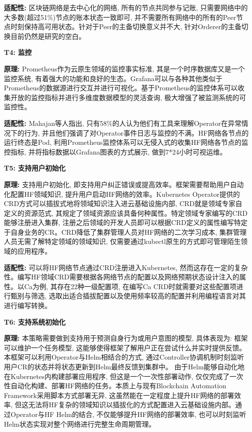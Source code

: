 \textbf{适配性: }区块链网络是去中心化的网络, 所有的节点共同参与记账, 只需要网络中的大多数(超过51\%)节点的账本状态一致即可, 并不需要所有网络中的所有的Peer节点时刻保持高可用状态。针对于Peer的主备切换意义并不大, 针对Orderer的主备切换目前仍然是研究的空白。

\textbf{T4: 监控}

\textbf{原理: }Prometheus\cite{sukhija2019towards}作为云原生领域的监控事实标准, 其是一个时序数据库又是一个监控系统, 有着强大的功能和良好的生态。Grafana可以与各种其他类似于Prometheus的数据源进行交互并进行可视化。基于Prometheus的监控体系可以收集开放的监控指标并进行多维度数据模型的灵活查询, 极大增强了被监测系统的可监控性。

\textbf{适配性: } Mahajan等人\cite{mahajan2020suture}指出, 只有58\%的人认为他们有工具来理解Operator在异常情况下的行为, 并且他们强调了对Operator事件日志与监控的不满。HF网络各节点的运行终态是Pod, 利用Prometheus监控体系可以无侵入式的收集HF网络各节点的监控指标, 并将指标数据以Grafana图表的方式展示, 做到7*24小时可视运维。


\textbf{T5: 支持用户初始化}

\textbf{原理: }支持用户初始化, 即支持用户纠正错误或提高效率。框架需要帮助用户自动化配置HF领域知识, 提升用户启动HF网络的效率。Kubernetes Operator提供的CRD方式可以插拔式地将领域知识注入进云基础设施内部, CRD就是领域专家自定义的资源范式, 其规定了领域资源应该具备何种属性。特定领域专家编写的CRD能够注册进入集群, 注册之后领域的开发人员即可以根据CRD定义的属性编写特定于自身业务的CR。CRD降低了集群管理人员对HF网络的二次学习成本, 集群管理人员无需了解特定领域的领域知识, 仅需要通过kubectl原生的方式即可管理陌生领域的应用程序。

\textbf{适配性: }可以将HF网络节点通过CRD注册进入Kubernetes, 然而这存在一定的复杂性。编写HF领域CRD需要根据各网络节点的配置\footnotemark[1]\footnotemark[2]\footnotemark[3]以及网络预期状态设计注入的属性。以Ca为例, 其存在22种一级配置项, 在编写Ca CRD时就需要对这些配置项进行甄别与筛选, 选取出适合插拔配置以及使用频率较高的配置并利用编程语言对其进行编写转换。

\textbf{T6: 支持系统初始化}

\textbf{原理: }本策略需要做到支持用于预测自身行为或用户意图的模型, 具体表现为: 框架可以维护一个任务模型, 这能够使得框架了解用户正在尝试什么并实时提供反馈。本框架可以利用Operator与Helm相结合的方式, 通过Controller协调机制时刻监听用户CR的状态并将状态更新到Helm最终反馈到集群中。
由于Helm能够自动化地在Kubernetes内构建部署应用程序, 但这是一个一次性部署动作, 仅仅完成了一次性自动化构建、部署HF网络的任务。本质上与现有Blockchain Automation Framework采用脚本方式部署无异, 这虽然能在一定程度上提升HF网络的部署效率, 但这无法将HF复杂的领域知识以插拔化的方式配置进入云基础设施内部。通过Operator与HF Helm的结合, 不仅能够提升HF网络的部署效率, 也可以时刻监听Helm状态实现对整个网络进行完整生命周期管理。

